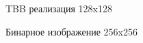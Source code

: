 \documentclass{report}
\begin{document}
\begin{figure}[H]
\caption{TBB реализация 128x128}
\end{figure}

\begin{figure}[H]
\caption{Бинарное изображение 256x256}
\end{figure}
\end{document}
